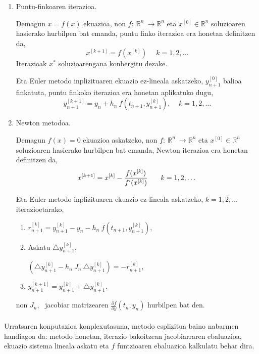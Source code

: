 \begin{enumerate}

\item Puntu-finkoaren iterazioa.

Demagun $x=f(x)$ ekuazioa, non $f: \  {\mathbb{R}}^n \ \longrightarrow {\mathbb{R}}^n$ eta  $x^{[0]} \in \mathbb{R}^n$ soluzioaren hasierako hurbilpen bat emanda, puntu finko iterazioa era honetan definitzen da,
\begin{equation*}
 x^{[k+1]}=f(x^{[k]}) \, \ \ \ \ \ k=1,2,\dots
\end{equation*}
Iterazioak $x^{\ast}$ soluzioarengana konbergitu dezake.

Eta  Euler metodo inplizituaren ekuazio ez-lineala askatzeko, $y_{n+1}^{[0]}$ balioa finkatuta, puntu finkoko iterazioa era honetan aplikatuko dugu, 
\begin{equation*}
y_{n+1}^{[k+1]}=y_{n}+h_n \ f(t_{n+1},y_{n+1}^{[k]}), \ \ \ \ \ k=1,2,\dots
\end{equation*}  

\item Newton metodoa.

Demagun $f(x)=0$ ekuazioa askatzeko, non $f: \  {\mathbb{R}}^n \ \longrightarrow {\mathbb{R}}^n$ eta  $x^{[0]} \in \mathbb{R}^n$ soluzioaren hasierako hurbilpen bat emanda, Newton iterazioa era honetan definitzen da,
\begin{equation*}
 x^{[k+1]}=x^{[k]}-\frac{f(x^{[k]})}{f`(x^{[k]})} \, \ \ \ \ \ k=1,2,\dots
\end{equation*}

Eta Euler metodo inplizituaren ekuazio ez-lineala askatzeko, $k=1,2,\dots$ iterazioetarako,
\begin{enumerate}
\item $r_{n+1}^{[k]}=y_{n+1}^{[k]}-y_n-h_n \ f(t_{n+1},y_{n+1}^{[k]})$,

\item Askatu $\triangle y_{n+1}^{[k]}$,

$(\triangle y_{n+1}^{[k]} - h_n \ J_n \ \triangle y_{n+1}^{[k]}) =- r_{n+1}^{[k]}$,

\item $y_{n+1}^{[k+1]} = y_{n+1}^{[k]}+ \triangle y_{n+1}^{[k]}$.
\end{enumerate}
non $J_n$,  ~jacobiar matrizearen $\frac{\partial f}{\partial y} (t_n, y_n)$ hurbilpen bat den.

\end{enumerate}

\paragraph*{}Urratsaren konputazioa konplexutasuna, metodo esplizitua baino nabarmen handiagoa da: metodo honetan, iterazio bakoitzean jacobiarraren ebaluazioa, ekuazio sistema lineala askatu eta $f$ funtzioaren ebaluazioa kalkulatu behar dira.

